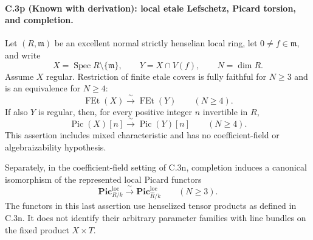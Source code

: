 \paragraph{C.3p (Known with derivation): local etale Lefschetz, Picard torsion, and completion.}
Let $(R,\mathfrak m)$ be an excellent normal strictly
henselian local ring, let $0\ne f\in\mathfrak m$,
and write
\[
 X=\operatorname{Spec}R\setminus\{\mathfrak m\},
 \qquad Y=X\cap V(f),\qquad N=\dim R.
\]
Assume $X$ regular. Restriction of finite etale covers
is fully faithful for $N\ge3$ and is an equivalence
for $N\ge4$:
\begin{equation}\label{eq:C3-etale-Lefschetz}
 \operatorname{FEt}(X)\xrightarrow{\ \sim\ }
 \operatorname{FEt}(Y)\qquad(N\ge4).
\end{equation}
If also $Y$ is regular, then, for every positive
integer $n$ invertible in $R$,
\begin{equation}\label{eq:C3-Picard-torsion-Lefschetz}
 \operatorname{Pic}(X)[n]\xrightarrow{\ \sim\ }
 \operatorname{Pic}(Y)[n]\qquad(N\ge4).
\end{equation}
This assertion includes mixed characteristic and
has no coefficient-field or algebraizability
hypothesis.

Separately, in the coefficient-field setting of
C.3n, completion induces a canonical isomorphism
of the represented local Picard functors
\begin{equation}\label{eq:C3-Picard-completion}
 \mathbf{Pic}^{\mathrm{loc}}_{R/k}
       \xrightarrow{\ \sim\ }
 \mathbf{Pic}^{\mathrm{loc}}_{\widehat R/k}
                     \qquad(N\ge3).
\end{equation}
The functors in this last assertion use
henselized tensor products as defined in C.3n.
It does not identify their arbitrary parameter
families with line bundles on the fixed product
$X\times T$.

